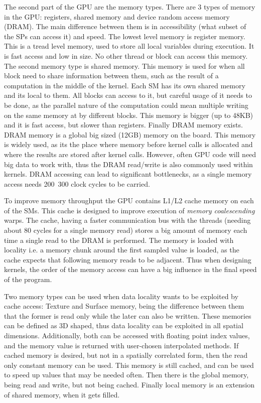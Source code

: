 The second part of the GPU are the memory types. There are 3 types of memory in the GPU: registers, shared memory and device random access memory (DRAM). The main difference between them is in accessibility (what subset of the SPs can access it) and speed. The lowest level memory is register memory. This is a tread level memory, used to store all local variables during execution. It is fast access and low in size. No other thread or block can access this memory. The second memory type is shared memory. This memory is used for when all block need to share information between them, such as the result of a computation in the middle of the kernel. Each SM has its own shared memory and its local to them. All blocks can access to it, but careful usage of it needs to be done, as the parallel nature of the computation could mean multiple writing on the same memory at by different blocks. This memory is bigger (up to 48KB) and it is fast access, but slower than registers. Finally DRAM memory exists. DRAM memory is a global big sized (12GB) memory on the board. This memory is widely used, as its the place where memory before kernel calls is allocated and where the results are stored after kernel calls. However, often GPU code will need big data to work with, thus the DRAM read/write is also commonly used within kernels. DRAM accessing can lead to significant bottlenecks, as a single memory access needs 200~300 clock cycles to be carried. 

To improve memory throughput the GPU contains L1/L2 cache memory on each of the SMs. This cache is designed to improve execution of \textit{memory coalescending} warps. The cache, having a faster communication bus with the threads (needing about 80 cycles for a single memory read) stores a big amount of memory each time a single read to the DRAM is performed. The memory is loaded with locality i.e. a memory chunk around the first sampled value is loaded, as the cache expects that following memory reads to be adjacent. Thus when designing kernels, the order of the memory access can have a big influence in the final speed of the program. 

Two memory types can be used when data locality wants to be exploited by cache access: Texture and Surface memory, being the difference between them that the former is read only while the later can also be written. These memories can be defined as 3D shaped, thus data locality can be exploited in all spatial dimensions. Additionally, both can be accessed with floating point index values, and the memory value is returned with user-chosen interpolated methods. If cached memory is desired, but not in a spatially correlated form, then the read only constant memory can be used. This memory is still cached, and can be used to speed up values that may be needed often. Then there is the global memory, being read and write, but not being cached. Finally local memory is an extension of shared memory, when it gets filled.


